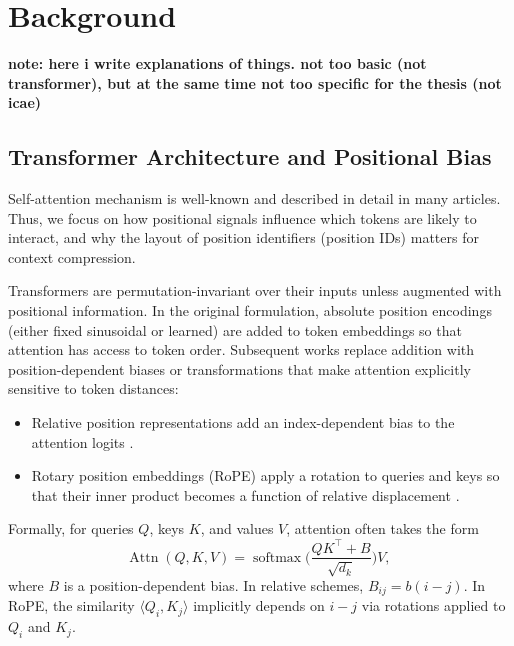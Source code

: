 \chapter{Background}
\textbf{note: here i write explanations of things. not too basic (not transformer), but at the same time not too specific for the thesis (not icae)}


\section{Transformer Architecture and Positional Bias}

Self-attention mechanism is well-known and described in detail in many articles. Thus, we focus on how positional signals influence which tokens are likely to interact, and why the layout of position identifiers (position IDs) matters for context compression.

Transformers are permutation-invariant over their inputs unless augmented with positional information. In the original formulation, absolute position encodings \cite{vaswani_attention_2017} (either fixed sinusoidal or learned) are added to token embeddings so that attention has access to token order. 
Subsequent works replace addition with position-dependent biases or transformations that make attention explicitly sensitive to token distances:

\begin{itemize}
  \item Relative position representations add an index-dependent bias to the attention logits \cite{shaw_relative_2018}.
  \item Rotary position embeddings (RoPE) apply a rotation to queries and keys so that their inner product becomes a function of relative displacement \cite{su_roformer_2021}.
\end{itemize}

Formally, for queries \(Q\), keys \(K\), and values \(V\), attention often takes the form
\[
\operatorname{Attn}(Q,K,V) = \operatorname{softmax}\Big( \frac{QK^\top + B}{\sqrt{d_k}} \Big) V,\
\]
where \(B\) is a position-dependent bias. In relative schemes, \(B_{ij} = b(i-j)\). In RoPE, the similarity \(\langle Q_i, K_j\rangle\) implicitly depends on \(i-j\) via rotations applied to \(Q_i\) and \(K_j\).

